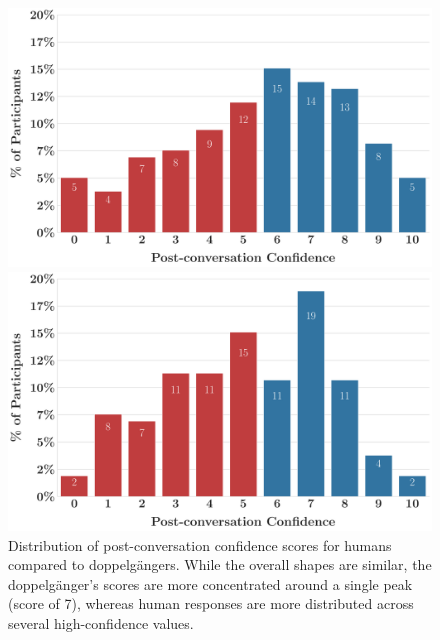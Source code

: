 \begin{figure}[ht!]
	\centering
	\begin{minipage}{0.48\textwidth}
		\centering
		\includegraphics[width=\linewidth]{fig/post-conf-human.pdf}
	\end{minipage}\hfill
	\begin{minipage}{0.49\textwidth}
		\centering
		\includegraphics[width=\linewidth]{fig/post-conf-gpt4-o.pdf}
	\end{minipage}
	\caption[Distribution of post-conversation confidence scores for humans compared to doppelgängers]{Distribution of post-conversation confidence scores for humans compared to doppelgängers. While the overall shapes are similar, the doppelgänger's scores are more concentrated around a single peak (score of 7), whereas human responses are more distributed across several high-confidence values.}
	\label{fig:post_conf_distributions}
\end{figure}


